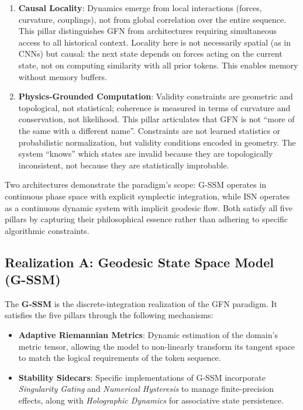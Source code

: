 \documentclass[12pt,a4paper]{article}
\begin{document}
\begin{enumerate}
    \item \textbf{Causal Locality}: Dynamics emerge from local interactions (forces, curvature, couplings), not from global correlation over the entire sequence. This pillar distinguishes GFN from architectures requiring simultaneous access to all historical context. Locality here is not necessarily spatial (as in CNNs) but causal: the next state depends on forces acting on the current state, not on computing similarity with all prior tokens. This enables memory without memory buffers.
    
    \item \textbf{Physics-Grounded Computation}: Validity constraints are geometric and topological, not statistical; coherence is measured in terms of curvature and conservation, not likelihood. This pillar articulates that GFN is not ``more of the same with a different name''. Constraints are not learned statistics or probabilistic normalization, but validity conditions encoded in geometry. The system ``knows'' which states are invalid because they are topologically inconsistent, not because they are statistically improbable.
\end{enumerate}

Two architectures demonstrate the paradigm's scope: G-SSM operates in continuous phase space with explicit symplectic integration, while ISN operates as a continuous dynamic system with implicit geodesic flow. Both satisfy all five pillars by capturing their philosophical essence rather than adhering to specific algorithmic constraints.

\subsection{Realization A: Geodesic State Space Model (G-SSM)}
\label{sec:gssm-model}

The \textbf{G-SSM} is the discrete-integration realization of the GFN paradigm. It satisfies the five pillars through the following mechanisms:

\begin{itemize}
    \item \textbf{Adaptive Riemannian Metrics}: Dynamic estimation of the domain's metric tensor, allowing the model to non-linearly transform its tangent space to match the logical requirements of the token sequence.
    
    \item \textbf{Stability Sidecars}: Specific implementations of G-SSM incorporate \textit{Singularity Gating} and \textit{Numerical Hysteresis} to manage finite-precision effects, along with \textit{Holographic Dynamics} for associative state persistence.
\end{itemize}
\end{document}
